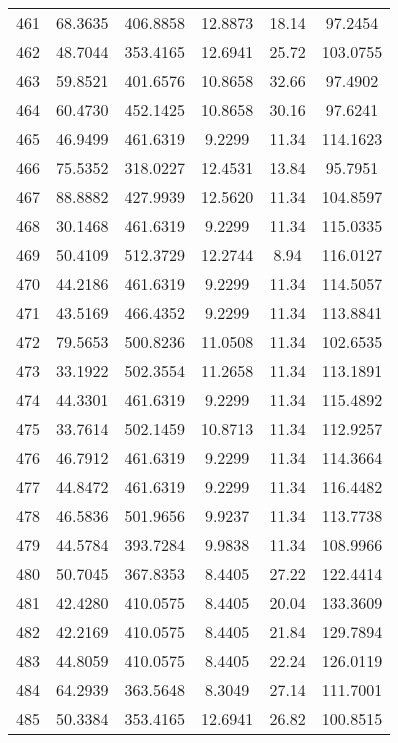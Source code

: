 \begin{center}
\begin{footnotesize}
\begin{tabular}{|c|ccccc|}
461 & 68.3635 & 406.8858 & 12.8873 & 18.14 & 97.2454 \\
462 & 48.7044 & 353.4165 & 12.6941 & 25.72 & 103.0755 \\
463 & 59.8521 & 401.6576 & 10.8658 & 32.66 & 97.4902 \\
464 & 60.4730 & 452.1425 & 10.8658 & 30.16 & 97.6241 \\
465 & 46.9499 & 461.6319 & 9.2299 & 11.34 & 114.1623 \\
466 & 75.5352 & 318.0227 & 12.4531 & 13.84 & 95.7951 \\
467 & 88.8882 & 427.9939 & 12.5620 & 11.34 & 104.8597 \\
468 & 30.1468 & 461.6319 & 9.2299 & 11.34 & 115.0335 \\
469 & 50.4109 & 512.3729 & 12.2744 & 8.94 & 116.0127 \\
470 & 44.2186 & 461.6319 & 9.2299 & 11.34 & 114.5057 \\
471 & 43.5169 & 466.4352 & 9.2299 & 11.34 & 113.8841 \\
472 & 79.5653 & 500.8236 & 11.0508 & 11.34 & 102.6535 \\
473 & 33.1922 & 502.3554 & 11.2658 & 11.34 & 113.1891 \\
474 & 44.3301 & 461.6319 & 9.2299 & 11.34 & 115.4892 \\
475 & 33.7614 & 502.1459 & 10.8713 & 11.34 & 112.9257 \\
476 & 46.7912 & 461.6319 & 9.2299 & 11.34 & 114.3664 \\
477 & 44.8472 & 461.6319 & 9.2299 & 11.34 & 116.4482 \\
478 & 46.5836 & 501.9656 & 9.9237 & 11.34 & 113.7738 \\
479 & 44.5784 & 393.7284 & 9.9838 & 11.34 & 108.9966 \\
480 & 50.7045 & 367.8353 & 8.4405 & 27.22 & 122.4414 \\
481 & 42.4280 & 410.0575 & 8.4405 & 20.04 & 133.3609 \\
482 & 42.2169 & 410.0575 & 8.4405 & 21.84 & 129.7894 \\
483 & 44.8059 & 410.0575 & 8.4405 & 22.24 & 126.0119 \\
484 & 64.2939 & 363.5648 & 8.3049 & 27.14 & 111.7001 \\
485 & 50.3384 & 353.4165 & 12.6941 & 26.82 & 100.8515 \\
\hline
\end{tabular}
\end{footnotesize}
\end{center}

